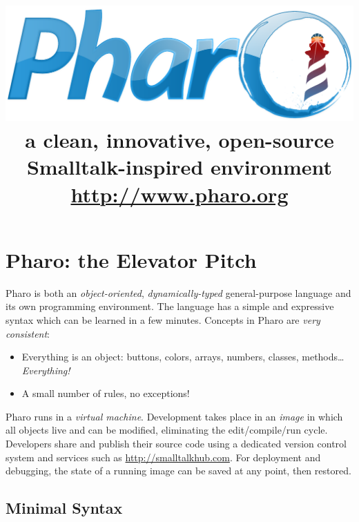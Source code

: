 \documentclass[notumble]{leaflet}
\title{%
  \vspace*{0.5\textwidth}%
  \normalfont
  \includegraphics[width=\linewidth]{logo.pdf}
  \\[1.8\baselineskip]%
  \fontseries{cl}\selectfont\Huge
  a clean, innovative, open-source Smalltalk-inspired environment\\
  \vfill
  \url{http://www.pharo.org}}
\date{}
\begin{document}
\maketitle
\thispagestyle{empty}

\pagebreak{}

\section{Pharo: the Elevator Pitch}

Pharo is both an \emph{object-oriented}, \emph{dynamically-typed}
general-purpose language and its own programming environment. The
language has a simple and expressive syntax which can be learned
in a few minutes. Concepts in Pharo are \emph{very consistent}:
\begin{itemize}
  \item Everything is an object: buttons, colors, arrays, numbers, classes, methods\ldots \emph{Everything!}
  \item A small number of rules, no exceptions!
\end{itemize}

Pharo runs in a \emph{virtual machine}. Development takes place in an
\emph{image} in which all objects live and can be modified,
eliminating the edit/compile/run cycle. Developers share and publish
their source code using a dedicated version control system and
services such as \url{http://smalltalkhub.com}. For deployment and
debugging, the state of a running image can be saved at any point,
then restored.

\subsection{Minimal Syntax}
\end{document}
